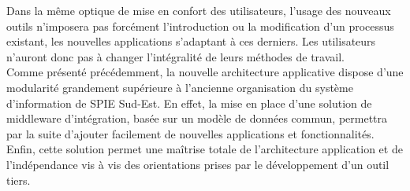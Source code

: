 Dans la même optique de mise en confort des utilisateurs, l’usage des nouveaux outils n’imposera pas forcément l’introduction ou la modification d’un processus existant, les nouvelles applications s’adaptant à ces derniers. Les utilisateurs n’auront donc pas à changer l’intégralité de leurs méthodes de travail. \\

Comme présenté précédemment, la nouvelle architecture applicative dispose d’une modularité grandement supérieure à l’ancienne organisation du système d’information de SPIE Sud-Est. En effet, la mise en place d’une solution de middleware d’intégration, basée sur un modèle de données commun, permettra par la suite d’ajouter facilement de nouvelles applications et fonctionnalités. \\

Enfin, cette solution permet une maîtrise totale de l’architecture application et de l’indépendance vis à vis des orientations prises par le développement d’un outil tiers. \\

